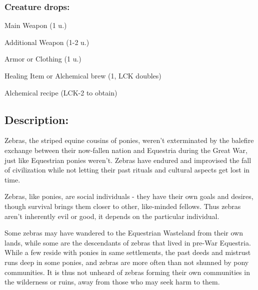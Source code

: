\documentclass[11pt,a4paper,twocolumn]{book}
\begin{document}
	\subsubsection*{Creature drops:}
	\begin{compactitem}
		\item Main Weapon (1 u.)
		\item Additional Weapon (1-2 u.)
		\item Armor or Clothing (1 u.)
		\item Healing Item or Alchemical brew (1, LCK doubles)
		\item Alchemical recipe (LCK-2 to obtain)
	\end{compactitem}
	
	\subsection*{Description:}
	Zebras, the striped equine cousins of ponies, weren't exterminated by the balefire exchange between their now-fallen nation and Equestria during the Great War, just like Equestrian ponies weren't. Zebras have endured and improvised the fall of civilization while not letting their past rituals and cultural aspects get lost in time.
	
	Zebras, like ponies, are social individuals - they have their own goals and desires, though survival brings them closer to other, like-minded fellows. Thus zebras aren't inherently evil or good, it depends on the particular individual.
	
	Some zebras may have wandered to the Equestrian Wasteland from their own lands, while some are the descendants of zebras that lived in pre-War Equestria. While a few reside with ponies in same settlements, the past deeds and mistrust runs deep in some ponies, and zebras are more often than not shunned by pony communities. It is thus not unheard of zebras forming their own communities in the wilderness or ruins, away from those who may seek harm to them.
	
	\clearpage
	
\end{document}

